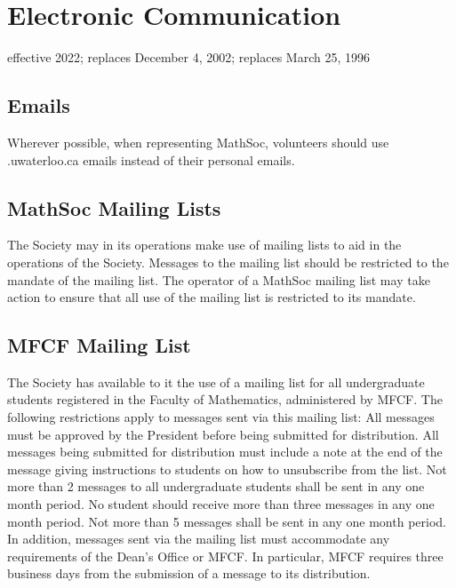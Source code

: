 \section{Electronic Communication}
effective 2022; replaces December 4, 2002; replaces March 25, 1996

\subsection{Emails}
Wherever possible, when representing MathSoc, volunteers should use \@mathsoc.uwaterloo.ca emails instead of their personal emails. 

\subsection{MathSoc Mailing Lists}
The Society may in its operations make use of mailing lists to aid in the operations of the Society. Messages to the mailing list should be restricted to the mandate of the mailing list. The operator of a MathSoc mailing list may take action to ensure that all use of the mailing list is restricted to its mandate.

\subsection{MFCF Mailing List}
The Society has available to it the use of a mailing list for all undergraduate students registered in the Faculty of Mathematics, administered by MFCF. The following restrictions apply to messages sent via this mailing list:
All messages must be approved by the President before being submitted for distribution.
All messages being submitted for distribution must include a note at the end of the message giving instructions to students on how to unsubscribe from the list.
Not more than 2 messages to all undergraduate students shall be sent in any one month period.
No student should receive more than three messages in any one month period.
Not more than 5 messages shall be sent in any one month period.
In addition, messages sent via the mailing list must accommodate any requirements of the Dean’s Office or MFCF. In particular, MFCF requires three business days from the submission of a message to its distribution.